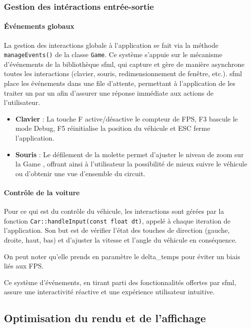 \subsubsection{Gestion des intéractions entrée-sortie}\label{subsubsec:gestion-des-interactions-entree-sortie}
\paragraph{Événements globaux}
La gestion des interactions globale à l'application se fait via la méthode \texttt{manageEvents()} de la classe \texttt{Game}.
Ce système s'appuie sur le mécanisme d'événements de la bibliothèque \gls{sfml}, qui capture et gère de manière asynchrone toutes les interactions (clavier, souris, redimensionnement de fenêtre, etc.).
\gls{sfml} place les événements dans une file d'attente, permettant à l'application de les traiter un par un afin d'assurer une réponse immédiate aux actions de l'utilisateur.

\begin{itemize}
    \item \textbf{Clavier} : La touche F active/désactive le compteur de FPS, F3 bascule le mode Debug, F5 réinitialise la position du véhicule et ESC ferme l'application.
    \item \textbf{Souris} : Le défilement de la molette permet d'ajuster le niveau de zoom sur la Game , offrant ainsi à l'utilisateur la possibilité de mieux suivre le véhicule ou d'obtenir une vue d'ensemble du circuit.
\end{itemize}

\paragraph{Contrôle de la voiture}
Pour ce qui est du contrôle du véhicule, les interactions sont gérées par la fonction \texttt{Car::handleInput(const float dt)}, appelé à chaque iteration de l'application.
Son but est de vérifier l'état des touches de direction (gauche, droite, haut, bas) et d'ajuster la vitesse et l'angle du véhicule en conséquence.

On peut noter qu'elle prends en paramètre le \gls{delta_temps} pour éviter un biais liés aux \gls{FPS}.

Ce système d'événements, en tirant parti des fonctionnalités offertes par \gls{sfml}, assure une interactivité réactive et une expérience utilisateur intuitive.

\subsection{Optimisation du rendu et de l'affichage}\label{subsec:optimisation-du-rendu-et-de-l-affichage}
